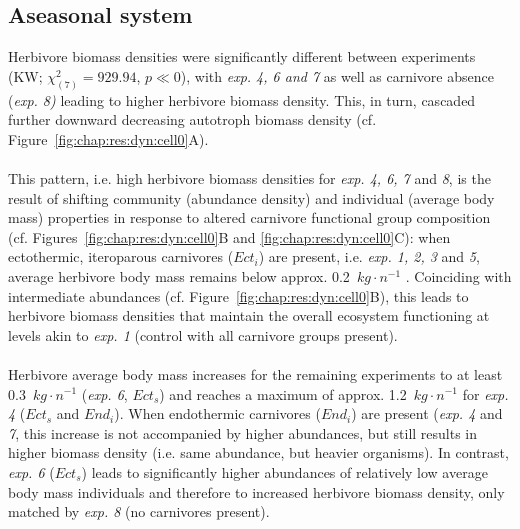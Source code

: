 \subsection{Aseasonal system}
\label{chap:res:popind:cell0}
Herbivore biomass densities were significantly different between experiments  (KW; $\chi^{2}_{(7)} = 929.94$, $p \ll 0$), with \textit{exp. 4, 6 and 7} as well as carnivore absence (\textit{exp. 8)} leading to higher herbivore biomass density. 
This, in turn, cascaded further downward decreasing autotroph biomass density (cf. Figure~\ref{fig:chap:res:dyn:cell0}A).
\\\\
This pattern, i.e. high herbivore biomass densities for \textit{exp. 4, 6, 7} and \textit{8}, is the result of shifting community (abundance density) and individual (average body mass) properties in response to altered carnivore functional group composition (cf. Figures~\ref{fig:chap:res:dyn:cell0}B and \ref{fig:chap:res:dyn:cell0}C): when ectothermic, iteroparous carnivores ($Ect_i$) are present, i.e. \textit{exp. 1, 2, 3} and \textit{5}, average herbivore body mass remains below approx. 0.2~$kg\cdot n^{-1}$ . 
Coinciding with intermediate abundances (cf. Figure~\ref{fig:chap:res:dyn:cell0}B), 
this leads to herbivore biomass densities that maintain the overall ecosystem functioning at levels akin to \textit{exp. 1} (control with all carnivore groups present).\\\\
Herbivore average body mass increases for the remaining experiments to at least 0.3~$kg\cdot n^{-1}$ (\textit{exp. 6}, $Ect_s$) and reaches a maximum of approx. 1.2~$kg\cdot n^{-1}$ for \textit{exp. 4}  ($Ect_s$ and $End_i$). 
When endothermic carnivores ($End_i$) are present (\textit{exp. 4} and \textit{7}, this increase is not accompanied by higher abundances, but still results in higher biomass density (i.e. same abundance, but heavier organisms). 
In contrast, \textit{exp. 6} ($Ect_s$) leads to significantly higher abundances of relatively low average body mass individuals and therefore to increased herbivore biomass density, only matched by \textit{exp. 8} (no carnivores present).



